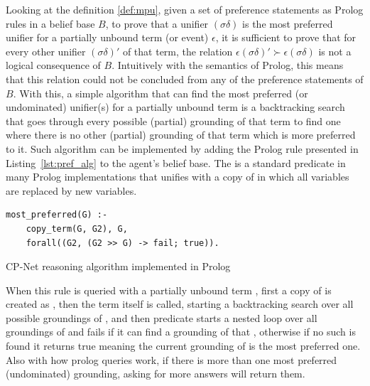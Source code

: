 Looking at the definition \ref{def:mpu}, given a set of preference statements as Prolog rules in a belief base $B$, to prove that a unifier $(\sigma\delta)$ is the most preferred unifier for a partially unbound term (or event) $\epsilon$, it is sufficient to prove that for every other unifier $(\sigma\delta)'$ of that term, the relation $\epsilon(\sigma\delta)' \succ \epsilon(\sigma\delta)$ is not a logical consequence of $B$. Intuitively with the semantics of Prolog, this means that this relation could not be concluded from any of the preference statements of $B$. With this, a simple algorithm that can find the most preferred (or undominated) unifier(s) for a partially unbound term is a backtracking search that goes through every possible (partial) grounding of that term to find one where there is no other (partial) grounding of that term which is more preferred to it. Such algorithm can be implemented by adding the Prolog rule presented in Listing~\ref{lst:pref_alg} to the agent's belief base. The  is a standard predicate in many Prolog implementations that unifies  with a copy of  in which all variables are replaced by new variables. 
\begin{listing}[!ht]
\centering
\begin{tcolorbox}[left=2pt,right=2pt,top=2pt,bottom=2pt,arc=0pt,
                  boxrule=0pt,toprule=1pt,
                  colback=white]
\begin{verbatim}
most_preferred(G) :- 
    copy_term(G, G2), G, 
    forall((G2, (G2 >> G) -> fail; true)).
\end{verbatim}
\end{tcolorbox}
\caption{CP-Net reasoning algorithm implemented in Prolog}
\label{lst:pref_alg}

\end{listing}

When this rule is queried with a partially unbound term , first a copy of  is created as , then the term  itself is called, starting a backtracking search over all possible groundings of , and then  predicate starts a nested loop over all groundings of  and fails if it can find a grounding of  that , otherwise if no such  is found it returns true meaning the current grounding of  is the most preferred one. Also with how prolog queries work, if there is more than one most preferred (undominated) grounding, asking for more answers will return them.

